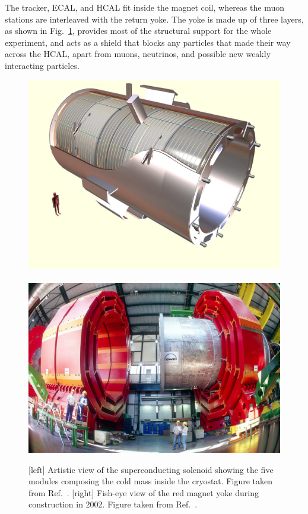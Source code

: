 The tracker, ECAL, and HCAL fit inside the magnet coil, whereas the muon stations are interleaved
with the return yoke. The yoke is made up of three layers, as shown in Fig.~\ref{fig:cms_magnet},
provides most of the structural support for the whole experiment, and acts as a shield that blocks
any particles that made their way across the HCAL, apart from muons, neutrinos, and possible new
weakly interacting particles. 

\begin{figure}[htpb]
  \centering
  \includegraphics[height=0.2\textheight,clip=true,trim=0 2cm 0 0]{figures/cms/CMS_solenoid}
  ~
  \includegraphics[height=0.2\textheight]{figures/cms/cms_magnet}
  \caption{[left] Artistic view of the superconducting solenoid showing the five modules composing
the cold mass inside the cryostat. Figure taken from Ref.~\cite{Chatrchyan:2008aa}.
  [right] Fish-eye view of the red magnet yoke during construction in
2002. Figure taken from Ref.~\cite{CMS_magnet}.
  \label{fig:cms_magnet}}
\end{figure}

